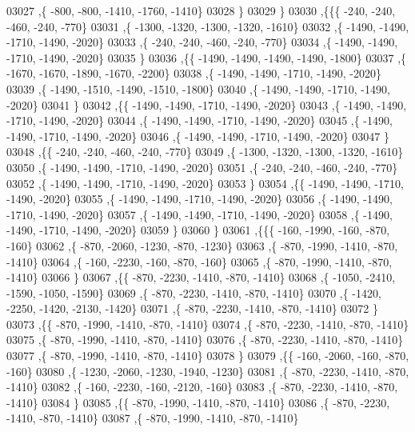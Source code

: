 \begin{DoxyCode}
03027     ,\{  -800,  -800, -1410, -1760, -1410\}
03028     \}
03029    \}
03030   ,\{\{\{  -240,  -240,  -460,  -240,  -770\}
03031     ,\{ -1300, -1320, -1300, -1320, -1610\}
03032     ,\{ -1490, -1490, -1710, -1490, -2020\}
03033     ,\{  -240,  -240,  -460,  -240,  -770\}
03034     ,\{ -1490, -1490, -1710, -1490, -2020\}
03035     \}
03036    ,\{\{ -1490, -1490, -1490, -1490, -1800\}
03037     ,\{ -1670, -1670, -1890, -1670, -2200\}
03038     ,\{ -1490, -1490, -1710, -1490, -2020\}
03039     ,\{ -1490, -1510, -1490, -1510, -1800\}
03040     ,\{ -1490, -1490, -1710, -1490, -2020\}
03041     \}
03042    ,\{\{ -1490, -1490, -1710, -1490, -2020\}
03043     ,\{ -1490, -1490, -1710, -1490, -2020\}
03044     ,\{ -1490, -1490, -1710, -1490, -2020\}
03045     ,\{ -1490, -1490, -1710, -1490, -2020\}
03046     ,\{ -1490, -1490, -1710, -1490, -2020\}
03047     \}
03048    ,\{\{  -240,  -240,  -460,  -240,  -770\}
03049     ,\{ -1300, -1320, -1300, -1320, -1610\}
03050     ,\{ -1490, -1490, -1710, -1490, -2020\}
03051     ,\{  -240,  -240,  -460,  -240,  -770\}
03052     ,\{ -1490, -1490, -1710, -1490, -2020\}
03053     \}
03054    ,\{\{ -1490, -1490, -1710, -1490, -2020\}
03055     ,\{ -1490, -1490, -1710, -1490, -2020\}
03056     ,\{ -1490, -1490, -1710, -1490, -2020\}
03057     ,\{ -1490, -1490, -1710, -1490, -2020\}
03058     ,\{ -1490, -1490, -1710, -1490, -2020\}
03059     \}
03060    \}
03061   ,\{\{\{  -160, -1990,  -160,  -870,  -160\}
03062     ,\{  -870, -2060, -1230,  -870, -1230\}
03063     ,\{  -870, -1990, -1410,  -870, -1410\}
03064     ,\{  -160, -2230,  -160,  -870,  -160\}
03065     ,\{  -870, -1990, -1410,  -870, -1410\}
03066     \}
03067    ,\{\{  -870, -2230, -1410,  -870, -1410\}
03068     ,\{ -1050, -2410, -1590, -1050, -1590\}
03069     ,\{  -870, -2230, -1410,  -870, -1410\}
03070     ,\{ -1420, -2250, -1420, -2130, -1420\}
03071     ,\{  -870, -2230, -1410,  -870, -1410\}
03072     \}
03073    ,\{\{  -870, -1990, -1410,  -870, -1410\}
03074     ,\{  -870, -2230, -1410,  -870, -1410\}
03075     ,\{  -870, -1990, -1410,  -870, -1410\}
03076     ,\{  -870, -2230, -1410,  -870, -1410\}
03077     ,\{  -870, -1990, -1410,  -870, -1410\}
03078     \}
03079    ,\{\{  -160, -2060,  -160,  -870,  -160\}
03080     ,\{ -1230, -2060, -1230, -1940, -1230\}
03081     ,\{  -870, -2230, -1410,  -870, -1410\}
03082     ,\{  -160, -2230,  -160, -2120,  -160\}
03083     ,\{  -870, -2230, -1410,  -870, -1410\}
03084     \}
03085    ,\{\{  -870, -1990, -1410,  -870, -1410\}
03086     ,\{  -870, -2230, -1410,  -870, -1410\}
03087     ,\{  -870, -1990, -1410,  -870, -1410\}

\end{DoxyCode}
